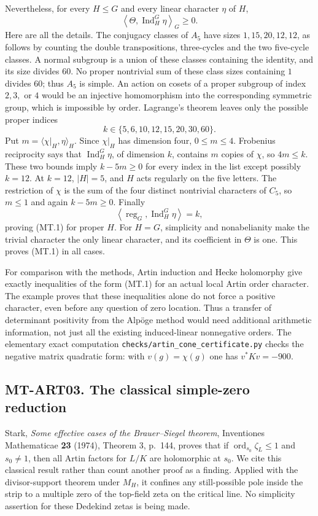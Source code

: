 Nevertheless, for every $H\le G$ and every linear character $\eta$ of $H$,
\[
       \left\langle\Theta,\operatorname{Ind}_H^G\eta\right\rangle_G
                    \ge0.                                      \tag{MT.1}
\]
Here are all the details.  The conjugacy classes of $A_5$ have sizes
$1,15,20,12,12$, as follows by counting the double transpositions,
three-cycles and the two five-cycle classes.  A normal subgroup is a union
of these classes containing the identity, and its size divides $60$.
No proper nontrivial sum of these class sizes containing $1$ divides $60$;
thus $A_5$ is simple.  An action on cosets of a proper subgroup of index
$2,3,$ or $4$ would be an injective homomorphism into the corresponding
symmetric group, which is impossible by order.  Lagrange's theorem leaves
only the possible proper indices
\[
                    k\in\{5,6,10,12,15,20,30,60\}.
\]
Put $m=\langle\chi|_H,\eta\rangle_H$.  Since $\chi|_H$ has dimension four,
$0\le m\le4$.  Frobenius reciprocity says that
$\operatorname{Ind}_H^G\eta$, of dimension $k$, contains $m$ copies of
$\chi$, so $4m\le k$.  These two bounds imply $k-5m\ge0$ for every index
in the list except possibly $k=12$.  At $k=12$, $|H|=5$, and $H$ acts
regularly on the five letters.  The restriction of $\chi$ is the sum of
the four distinct nontrivial characters of $C_5$, so $m\le1$ and again
$k-5m\ge0$.  Finally
\[
 \left\langle\operatorname{reg}_G,
       \operatorname{Ind}_H^G\eta\right\rangle=k,
\]
proving (MT.1) for proper $H$.  For $H=G$, simplicity and nonabelianity
make the trivial character the only linear character, and its coefficient
in $\Theta$ is one.  This proves (MT.1) in all cases.

For comparison with the methods, Artin induction and Hecke holomorphy
give exactly inequalities of the form (MT.1) for an actual local Artin
order character.  The example proves that these inequalities alone do not
force a positive character, even before any question of zero location.
Thus a transfer of determinant positivity from the Alp\"oge method would
need additional arithmetic information, not just all the existing
induced-linear nonnegative orders.  The elementary exact computation
\texttt{checks/artin\_cone\_certificate.py} checks the negative matrix
quadratic form: with $v(g)=\chi(g)$ one has $v^*Kv=-900$.

\subsection*{MT-ART03. The classical simple-zero reduction}
Stark, \emph{Some effective cases of the Brauer--Siegel theorem},
Inventiones Mathematicae \textbf{23} (1974), Theorem 3, p.~144, proves
that if $\operatorname{ord}_{s_0}\zeta_L\le1$ and $s_0\ne1$, then all
Artin factors for $L/K$ are holomorphic at $s_0$.  We cite this classical
result rather than count another proof as a finding.  Applied with the
divisor-support theorem under $M_H$, it confines any still-possible pole
inside the strip to a multiple zero of the top-field zeta on the critical
line.  No simplicity assertion for these Dedekind zetas is being made.


